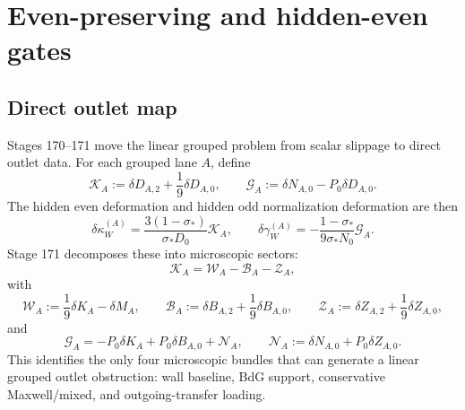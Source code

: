\section{Even-preserving and hidden-even gates}
\label{sec:part05_weak_axisymmetric_orbit:even-preserving-and-hidden-even-gates}

\subsection{Direct outlet map}
Stages 170--171 move the linear grouped problem from scalar slippage to direct outlet data.  For each grouped lane \(A\), define
\begin{equation}
\label{eq:part05-KG-defs-section}
\mathcal K_A:=\delta D_{A,2}+\frac19\delta D_{A,0},
\qquad
\mathcal G_A:=\delta N_{A,0}-P_0\delta D_{A,0}.
\end{equation}
The hidden even deformation and hidden odd normalization deformation are then
\begin{equation}
\label{eq:part05-dk-dg-outlet}
\delta\kappa_W^{(A)}
=
\frac{3(1-\sigma_*)}{\sigma_*D_0}\mathcal K_A,
\qquad
\delta\gamma_W^{(A)}
=-\frac{1-\sigma_*}{9\sigma_*N_0}\mathcal G_A.
\end{equation}
Stage 171 decomposes these into microscopic sectors:
\begin{equation}
\label{eq:part05-K-decomp}
\mathcal K_A
=
\mathcal W_A-\mathcal B_A-\mathcal Z_A,
\end{equation}
with
\begin{equation}
\label{eq:part05-WBZ-defs}
\mathcal W_A:=\frac19\delta K_A-\delta M_A,
\qquad
\mathcal B_A:=\delta B_{A,2}+\frac19\delta B_{A,0},
\qquad
\mathcal Z_A:=\delta Z_{A,2}+\frac19\delta Z_{A,0},
\end{equation}
and
\begin{equation}
\label{eq:part05-G-decomp}
\mathcal G_A
=
-P_0\delta K_A+P_0\delta B_{A,0}+\mathcal N_A,
\qquad
\mathcal N_A:=\delta N_{A,0}+P_0\delta Z_{A,0}.
\end{equation}
This identifies the only four microscopic bundles that can generate a linear grouped outlet obstruction: wall baseline, BdG support, conservative Maxwell/mixed, and outgoing-transfer loading.

